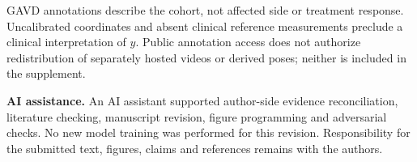 \documentclass{article}
\begin{document}
GAVD annotations describe the cohort, not affected side or treatment
response. Uncalibrated coordinates and absent clinical reference
measurements preclude a clinical interpretation of \(y\). Public
annotation access does not authorize redistribution of separately hosted
videos or derived poses; neither is included in the supplement.

\textbf{AI assistance.} An AI assistant supported author-side evidence
reconciliation, literature checking, manuscript revision, figure
programming and adversarial checks. No new model training was performed
for this revision. Responsibility for the submitted text, figures,
claims and references remains with the authors.
\end{document}
